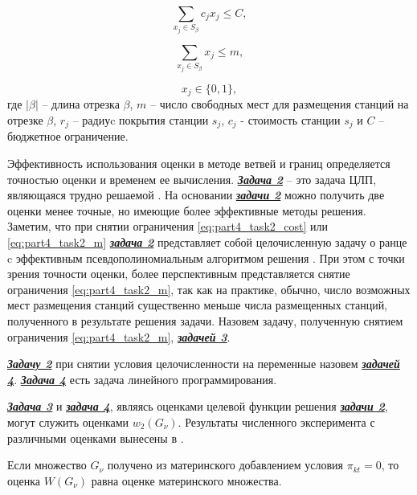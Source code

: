\begin{equation}\label{eq:part4_task2_cost}
    \sum\limits_{x_j \in S_\beta} c_j x_j \leqslant C,
\end{equation}

\begin{equation}\label{eq:part4_task2_m}
    \sum\limits_{x_j \in S_\beta} x_j \leqslant m,
\end{equation}

\begin{displaymath}
    x_j \in \{0, 1\},
\end{displaymath}
где $|\beta|$ -- длина отрезка $\beta$, $m$ -- число свободных мест для размещения станций на отрезке $\beta$, $r_j$ -- радиуc покрытия станции $s_j$, $c_j$ - стоимость станции $s_j$ и $C$ -- бюджетное ограничение.

Эффективность использования оценки в методе ветвей и границ определяется точностью оценки и временем ее вычисления. \underline{\textit{\textbf{Задача 2}}} -- это задача ЦЛП, являющаяся трудно решаемой \cite{Gari}. На основании \underline{\textit{\textbf{задачи 2}}} можно получить две оценки менее точные, но имеющие более эффективные методы решения. Заметим, что при снятии ограничения \cref{eq:part4_task2_cost} или \cref{eq:part4_task2_m} \underline{\textit{\textbf{задача 2}}} представляет собой целочисленную задачу о ранце c эффективным псевдополиномиальным алгоритмом решения \cite{Gari}. При этом с точки зрения точности оценки, более перспективным представляется снятие ограничения \cref{eq:part4_task2_m}, так как на практике, обычно, число возможных мест размещения станций существенно меньше числа размещенных станций, полученного в результате решения задачи. Назовем задачу, полученную снятием ограничения \cref{eq:part4_task2_m}, \underline{\textit{\textbf{задачей 3}}}.

\underline{\textit{\textbf{Задачу 2}}} при снятии условия целочисленности на переменные назовем \underline{\textit{\textbf{задачей 4}}}. \underline{\textit{\textbf{Задача 4}}} есть задача линейного программирования. 

\underline{\textit{\textbf{Задача 3}}} и \underline{\textit{\textbf{задача 4}}}, являясь оценками целевой функции решения \underline{\textit{\textbf{задачи 2}}}, могут служить оценками $w_2 (G_\nu)$. Результаты численного эксперимента с различными оценками вынесены в .

Если множество $G_\nu$ получено из материнского добавлением условия $\pi_{kt}=0$, то оценка $W(G_\nu)$ равна оценке материнского множества.

